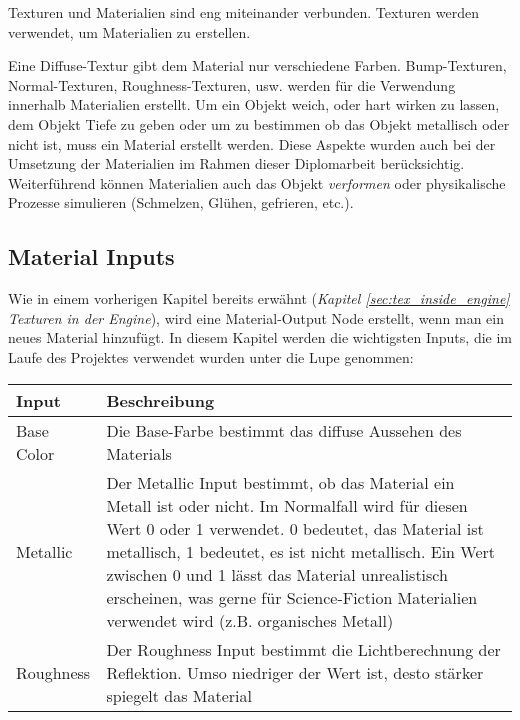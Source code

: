 {Texturen und Materialien sind eng miteinander verbunden. Texturen werden verwendet, um Materialien zu erstellen.

Eine Diffuse-Textur gibt dem Material nur verschiedene Farben. Bump-Texturen, Normal-Texturen, Roughness-Texturen, usw.
werden für die Verwendung innerhalb Materialien erstellt. Um ein Objekt weich, oder hart wirken zu lassen, dem
Objekt Tiefe zu geben oder um zu bestimmen ob das Objekt metallisch oder nicht ist, muss ein Material erstellt werden.
Diese Aspekte wurden auch bei der Umsetzung der Materialien im Rahmen dieser Diplomarbeit berücksichtig. Weiterführend
können Materialien auch das Objekt \textit{verformen} oder physikalische Prozesse simulieren (Schmelzen, Glühen,
gefrieren, etc.).

\subsection{Material Inputs}
\label{sec:mat_inputs}

Wie in einem vorherigen Kapitel bereits erwähnt (\textit{Kapitel \ref{sec:tex_inside_engine} Texturen in der Engine}), wird eine Material-Output Node
erstellt, wenn man ein neues Material hinzufügt. In diesem Kapitel werden die wichtigsten Inputs, die im Laufe des
Projektes verwendet wurden unter die Lupe genommen:

\begin{longtable}{|p{4cm}|p{9.6cm}|}
    \hline
    \endfirsthead
    \textbf{Input} & \textbf{Beschreibung}\\
    \hline
    \endhead

    Base Color & Die Base-Farbe bestimmt das diffuse Aussehen des Materials \\
    \hline

    Metallic & Der Metallic Input bestimmt, ob das Material ein Metall ist oder nicht. Im Normalfall wird für
    diesen Wert 0 oder 1 verwendet. 0 bedeutet, das Material ist metallisch, 1 bedeutet, es ist nicht
    metallisch. Ein Wert zwischen 0 und 1 lässt das Material unrealistisch erscheinen, was gerne
    für Science-Fiction Materialien verwendet wird (z.B. organisches Metall) \\
    \hline

    Roughness & Der Roughness Input bestimmt die Lichtberechnung der Reflektion. Umso niedriger der Wert
    ist, desto stärker spiegelt das Material \\
    \hline


\end{longtable}}
